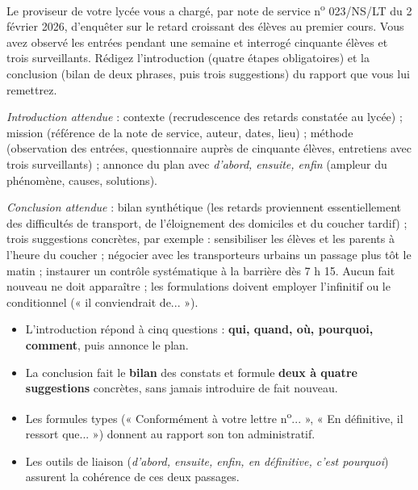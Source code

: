 \documentclass[11pt]{article}
\begin{document}
\begin{exercice}
Le proviseur de votre lycée vous a chargé, par note de service n\textsuperscript{o} 023/NS/LT du 2 février 2026, d'enquêter sur le retard croissant des élèves au premier cours. Vous avez observé les entrées pendant une semaine et interrogé cinquante élèves et trois surveillants. Rédigez l'introduction (quatre étapes obligatoires) et la conclusion (bilan de deux phrases, puis trois suggestions) du rapport que vous lui remettrez.
\end{exercice}

\begin{corrige}
\emph{Introduction attendue} : contexte (recrudescence des retards constatée au lycée) ; mission (référence de la note de service, auteur, dates, lieu) ; méthode (observation des entrées, questionnaire auprès de cinquante élèves, entretiens avec trois surveillants) ; annonce du plan avec \emph{d'abord, ensuite, enfin} (ampleur du phénomène, causes, solutions).

\emph{Conclusion attendue} : bilan synthétique (les retards proviennent essentiellement des difficultés de transport, de l'éloignement des domiciles et du coucher tardif) ; trois suggestions concrètes, par exemple : sensibiliser les élèves et les parents à l'heure du coucher ; négocier avec les transporteurs urbains un passage plus tôt le matin ; instaurer un contrôle systématique à la barrière dès 7 h 15. Aucun fait nouveau ne doit apparaître ; les formulations doivent employer l'infinitif ou le conditionnel (« il conviendrait de... »).
\end{corrige}

\begin{aretenir}[L'essentiel]
\begin{itemize}
\item L'introduction répond à cinq questions : \textbf{qui, quand, où, pourquoi, comment}, puis annonce le plan.
\item La conclusion fait le \textbf{bilan} des constats et formule \textbf{deux à quatre suggestions} concrètes, sans jamais introduire de fait nouveau.
\item Les formules types (« Conformément à votre lettre n\textsuperscript{o}... », « En définitive, il ressort que... ») donnent au rapport son ton administratif.
\item Les outils de liaison (\emph{d'abord, ensuite, enfin, en définitive, c'est pourquoi}) assurent la cohérence de ces deux passages.
\end{itemize}
\end{aretenir}
\end{document}
